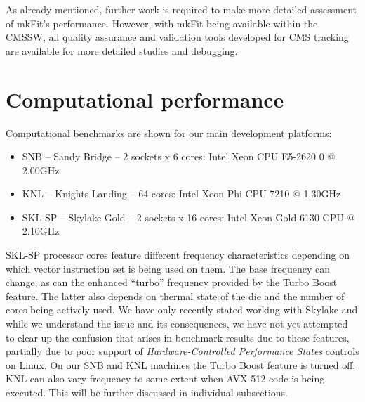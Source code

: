 \documentclass{webofc}
\def\mkfit{mkFit\xspace}
\begin{document}

As already mentioned, further work is required to make more detailed
assessment of \mkfit's performance. However, with \mkfit being available
within the CMSSW, all quality assurance and validation tools developed for CMS
tracking are available for more detailed studies and debugging.



\section{Computational performance}
\label{sec:comp-perf}


Computational benchmarks are shown for our main development platforms:

\begin{itemize}

\item SNB -- Sandy Bridge -- 2 sockets x 6 cores: Intel Xeon CPU E5-2620 0 @ 2.00GHz

\item KNL -- Knights Landing -- 64 cores: Intel Xeon Phi CPU 7210 @ 1.30GHz

\item SKL-SP -- Skylake Gold -- 2 sockets x 16 cores: Intel Xeon Gold 6130 CPU @ 2.10GHz

\end{itemize}

SKL-SP processor cores feature different frequency characteristics depending on
which vector instruction set is being used on them. The base frequency can
change, as can the enhanced ``turbo'' frequency provided by the Turbo Boost
feature. The latter also depends on thermal state of the die and the number of
cores being actively used. We have only recently stated working with Skylake and
while we understand the issue and its consequences, we have not yet attempted to
clear up the confusion that arises in benchmark results due to these features,
partially due to poor support of \emph{Hardware-Controlled Performance States}
controls on Linux. On our SNB and KNL machines the Turbo Boost feature is turned
off. KNL can also vary frequency to some extent when AVX-512 code is being
executed. This will be further discussed in individual subsections.
\end{document}
